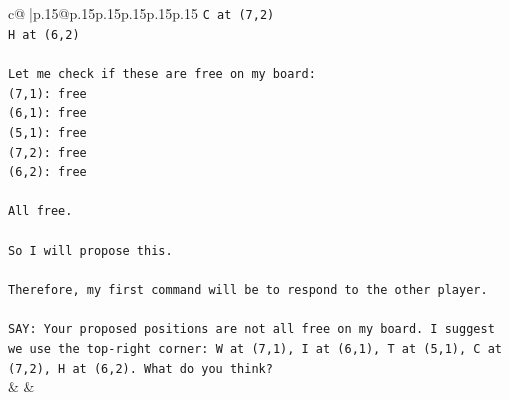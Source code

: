 \documentclass{article}
\begin{document}
{\begin{supertabular}{c@{$\;$}|p{.15\linewidth}@{}p{.15\linewidth}p{.15\linewidth}p{.15\linewidth}p{.15\linewidth}p{.15\linewidth}}
{{{\texttt{C at (7,2)} \\
\texttt{H at (6,2)} \\
\\ 
\texttt{Let me check if these are free on my board:} \\
\texttt{(7,1): free} \\
\texttt{(6,1): free} \\
\texttt{(5,1): free} \\
\texttt{(7,2): free} \\
\texttt{(6,2): free} \\
\\ 
\texttt{All free.} \\
\\ 
\texttt{So I will propose this.} \\
\\ 
\texttt{Therefore, my first command will be to respond to the other player.} \\
\\ 
\texttt{SAY: Your proposed positions are not all free on my board. I suggest we use the top{-}right corner: W at (7,1), I at (6,1), T at (5,1), C at (7,2), H at (6,2). What do you think?} \\
            }
        }
    }
    & & \\ \\


\end{supertabular}}
\end{document}
